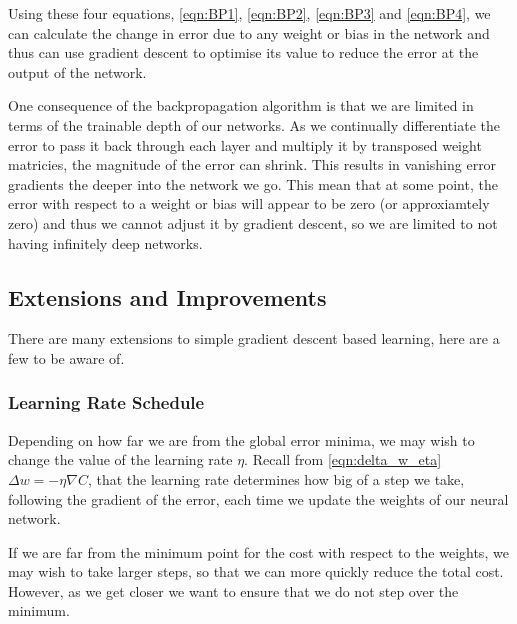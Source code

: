 Using these four equations, \autoref{eqn:BP1}, \autoref{eqn:BP2}, \autoref{eqn:BP3} and \autoref{eqn:BP4}, we can calculate the change in error due to any weight or bias in the network and thus can use gradient descent to optimise its value to reduce the error at the output of the network.

One consequence of the backpropagation algorithm is that we are limited in terms of the trainable depth of our networks. As we continually differentiate the error to pass it back through each layer and multiply it by transposed weight matricies, the magnitude of the error can shrink. This results in vanishing error gradients the deeper into the network we go. This mean that at some point, the error with respect to a weight or bias will appear to be zero (or approxiamtely zero) and thus we cannot adjust it by gradient descent, so we are limited to not having infinitely deep networks.

\subsection{Extensions and Improvements}
There are many extensions to simple gradient descent based learning, here are a few to be aware of.
\subsubsection{Learning Rate Schedule}
\label{sec:lr_sch}
Depending on how far we are from the global error minima, we may wish to change the value of the learning rate $\eta$. Recall from \autoref{eqn:delta_w_eta} $\Delta w = -\eta \nabla C$, that the learning rate determines how big of a step we take, following the gradient of the error, each time we update the weights of our neural network.

If we are far from the minimum point for the cost with respect to the weights, we may wish to take larger steps, so that we can more quickly reduce the total cost. However, as we get closer we want to ensure that we do not step over the minimum.

